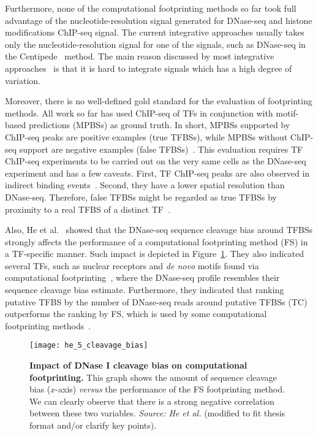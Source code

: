 Furthermore, none of the computational footprinting methods so far took full advantage of the nucleotide-resolution signal generated for DNase-seq and histone modifications ChIP-seq signal. The current integrative approaches usually takes only the nucleotide-resolution signal for one of the signals, such as DNase-seq in the Centipede~\cite{pique2011} method. The main reason discussed by most integrative approaches~\cite{pique2011,cuellar2012} is that it is hard to integrate signals which has a high degree of variation.

Moreover, there is no well-defined gold standard for the evaluation of footprinting methods. All work so far has used ChIP-seq of TFs in conjunction with motif-based predictions (MPBSs) as ground truth. In short, MPBSs supported by ChIP-seq peaks are positive examples (true TFBSs), while MPBSs without ChIP-seq support are negative examples (false TFBSs)~\cite{cuellar2012}. This evaluation requires TF ChIP-seq experiments to be carried out on the very same cells as the DNase-seq experiment and has a few caveats. First, TF ChIP-seq peaks are also observed in indirect binding events~\cite{yardimci2014}. Second, they have a lower spatial resolution than DNase-seq. Therefore, false TFBSs might be regarded as true TFBSs by proximity to a real TFBS of a distinct TF~\cite{cuellar2012,yardimci2014}.

Also, He et al.~\cite{he2014} showed that the DNase-seq sequence cleavage bias around TFBSs strongly affects the performance of a computational footprinting method (FS) in a TF-specific manner. Such impact is depicted in Figure~\ref{fig:he_cleavage_bias}. They also indicated several TFs, such as nuclear receptors and \emph{de novo} motifs found via computational footprinting~\cite{neph2012a}, where the DNase-seq profile resembles their sequence cleavage bias estimate. Furthermore, they indicated that ranking putative TFBS by the number of DNase-seq reads around putative TFBSs (TC) outperforms the ranking by FS, which is used by some computational footprinting methods~\cite{hesselberth2009,neph2012a}.

\begin{figure}[h!]
\centering
\texttt{[image: he\_5\_cleavage\_bias]}
\caption[Impact of DNase I cleavage bias on computational footprinting]{\textbf{Impact of DNase I cleavage bias on computational footprinting.} This graph shows the amount of sequence cleavage bias ($x$-axis) \emph{versus} the performance of the FS footprinting method. We can clearly observe that there is a strong negative correlation between these two variables. \emph{Source: He et al.}\cite{he2014} (modified to fit thesis format and/or clarify key points).}
\label{fig:he_cleavage_bias}
\end{figure}

